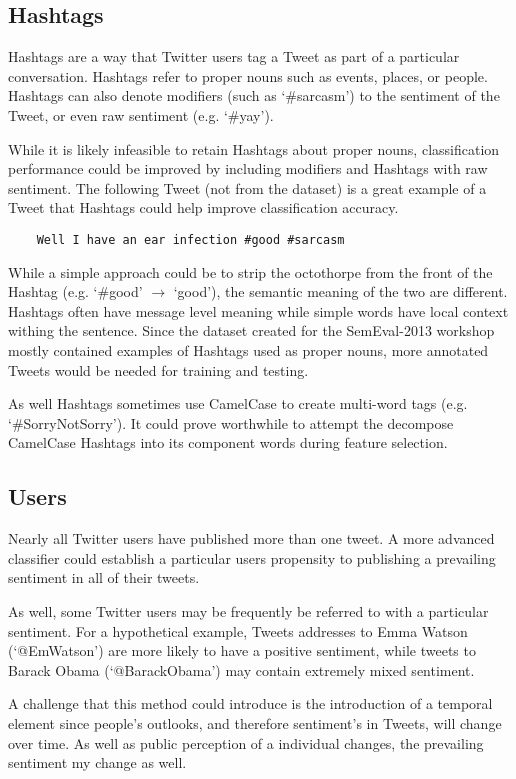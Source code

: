 \documentclass[12pt]{article}
\begin{document}
\subsection{Hashtags}

Hashtags are a way that Twitter users tag a Tweet as part of a particular
conversation. Hashtags refer to proper nouns such as events, places, or people.
Hashtags can also denote modifiers (such as `\#sarcasm') to the sentiment of the
Tweet, or even raw sentiment (e.g. `\#yay').

While it is likely infeasible to retain Hashtags about proper nouns,
classification performance could be improved by including modifiers and
Hashtags with raw sentiment. The following Tweet (not from the dataset) is a
great example of a Tweet that Hashtags could help improve classification
accuracy.

\begin{verbatim}
    Well I have an ear infection #good #sarcasm
\end{verbatim}

While a simple approach could be to strip the octothorpe from the front of the
Hashtag (e.g. `\#good' $\rightarrow$ `good'), the semantic meaning of the two
are different. Hashtags often have message level meaning while simple words
have local context withing the sentence. Since the dataset created for the
SemEval-2013 workshop mostly contained examples of Hashtags used as proper
nouns, more annotated Tweets would be needed for training and testing.

As well Hashtags sometimes use CamelCase to create multi-word tags (e.g.
`\#SorryNotSorry'). It could prove worthwhile to attempt the decompose
CamelCase Hashtags into its component words during feature selection.

\subsection{Users}

Nearly all Twitter users have published more than one tweet. A more advanced
classifier could establish a particular users propensity to publishing a
prevailing sentiment in all of their tweets.

As well, some Twitter users may be frequently be referred to with a particular
sentiment. For a hypothetical example, Tweets addresses to Emma Watson
(`@EmWatson') are more likely to have a positive sentiment, while tweets to
Barack Obama (`@BarackObama') may contain extremely mixed sentiment.

A challenge that this method could introduce is the introduction of a temporal
element since people's outlooks, and therefore sentiment's in Tweets, will
change over time. As well as public perception of a individual changes, the
prevailing sentiment my change as well.


\nocite{*}


\end{document}
